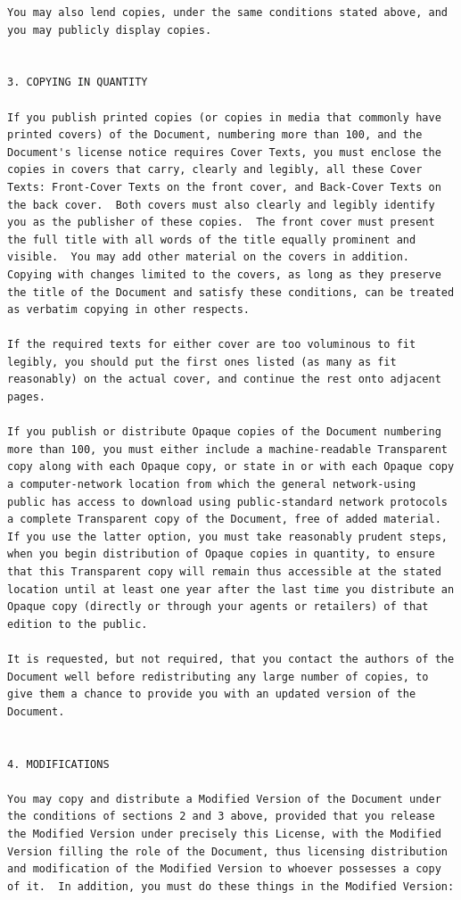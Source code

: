 \documentclass[a4paper]{report}
\begin{document}
\begin{verbatim}
You may also lend copies, under the same conditions stated above, and
you may publicly display copies.


3. COPYING IN QUANTITY

If you publish printed copies (or copies in media that commonly have
printed covers) of the Document, numbering more than 100, and the
Document's license notice requires Cover Texts, you must enclose the
copies in covers that carry, clearly and legibly, all these Cover
Texts: Front-Cover Texts on the front cover, and Back-Cover Texts on
the back cover.  Both covers must also clearly and legibly identify
you as the publisher of these copies.  The front cover must present
the full title with all words of the title equally prominent and
visible.  You may add other material on the covers in addition.
Copying with changes limited to the covers, as long as they preserve
the title of the Document and satisfy these conditions, can be treated
as verbatim copying in other respects.

If the required texts for either cover are too voluminous to fit
legibly, you should put the first ones listed (as many as fit
reasonably) on the actual cover, and continue the rest onto adjacent
pages.

If you publish or distribute Opaque copies of the Document numbering
more than 100, you must either include a machine-readable Transparent
copy along with each Opaque copy, or state in or with each Opaque copy
a computer-network location from which the general network-using
public has access to download using public-standard network protocols
a complete Transparent copy of the Document, free of added material.
If you use the latter option, you must take reasonably prudent steps,
when you begin distribution of Opaque copies in quantity, to ensure
that this Transparent copy will remain thus accessible at the stated
location until at least one year after the last time you distribute an
Opaque copy (directly or through your agents or retailers) of that
edition to the public.

It is requested, but not required, that you contact the authors of the
Document well before redistributing any large number of copies, to
give them a chance to provide you with an updated version of the
Document.


4. MODIFICATIONS

You may copy and distribute a Modified Version of the Document under
the conditions of sections 2 and 3 above, provided that you release
the Modified Version under precisely this License, with the Modified
Version filling the role of the Document, thus licensing distribution
and modification of the Modified Version to whoever possesses a copy
of it.  In addition, you must do these things in the Modified Version:


\end{verbatim}
\end{document}
